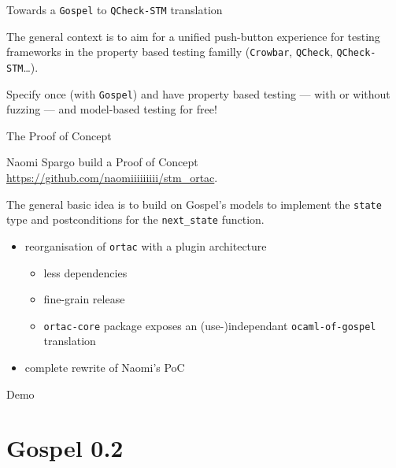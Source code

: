 \documentclass[pdf]{beamer}
\begin{document}
\begin{frame}{Towards a \texttt{Gospel} to \texttt{QCheck-STM} translation}

  The general context is to aim for a unified push-button experience for
  testing frameworks in the property based testing familly (\texttt{Crowbar},
  \texttt{QCheck}, \texttt{QCheck-STM}\dots).

  Specify once (with \texttt{Gospel}) and have property based testing ---
  with or without fuzzing --- and model-based testing for free!

\end{frame}

\begin{frame}{The Proof of Concept}

  Naomi Spargo build a Proof of Concept \url{https://github.com/naomiiiiiiiii/stm_ortac}.

  The general basic idea is to build on Gospel's models to implement the
  \texttt{state} type and postconditions for the \texttt{next\_state} function.

\end{frame}

\begin{frame}{}

  \begin{itemize}
    \item reorganisation of \texttt{ortac} with a plugin architecture
      \begin{itemize}
        \item less dependencies
        \item fine-grain release
        \item \texttt{ortac-core} package exposes an (use-)independant
          \texttt{ocaml-of-gospel} translation
      \end{itemize}
    \item complete rewrite of Naomi's PoC
  \end{itemize}

\end{frame}

\begin{frame}
  \centering
  \huge{Demo}
\end{frame}

\section{Gospel 0.2}
\end{document}
